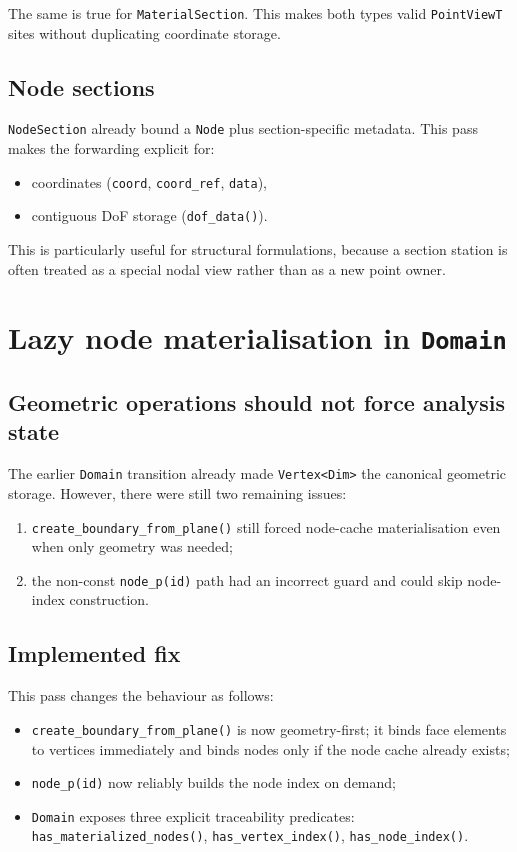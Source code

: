 The same is true for \texttt{MaterialSection}.  This makes both types valid
\texttt{PointViewT} sites without duplicating coordinate storage.

\subsection{Node sections}

\texttt{NodeSection} already bound a \texttt{Node} plus section-specific
metadata.  This pass makes the forwarding explicit for:
\begin{itemize}[nosep]
  \item coordinates (\texttt{coord}, \texttt{coord\_ref}, \texttt{data}),
  \item contiguous DoF storage (\texttt{dof\_data()}).
\end{itemize}

This is particularly useful for structural formulations, because a section
station is often treated as a special nodal view rather than as a new point
owner.

\section{Lazy node materialisation in \texttt{Domain}}

\subsection{Geometric operations should not force analysis state}

The earlier \texttt{Domain} transition already made \texttt{Vertex<Dim>} the
canonical geometric storage.  However, there were still two remaining issues:
\begin{enumerate}[nosep]
  \item \texttt{create\_boundary\_from\_plane()} still forced node-cache
        materialisation even when only geometry was needed;
  \item the non-const \texttt{node\_p(id)} path had an incorrect guard and
        could skip node-index construction.
\end{enumerate}

\subsection{Implemented fix}

This pass changes the behaviour as follows:
\begin{itemize}[nosep]
  \item \texttt{create\_boundary\_from\_plane()} is now geometry-first; it binds
        face elements to vertices immediately and binds nodes only if the node
        cache already exists;
  \item \texttt{node\_p(id)} now reliably builds the node index on demand;
  \item \texttt{Domain} exposes three explicit traceability predicates:
        \texttt{has\_materialized\_nodes()},
        \texttt{has\_vertex\_index()},
        \texttt{has\_node\_index()}.
\end{itemize}

